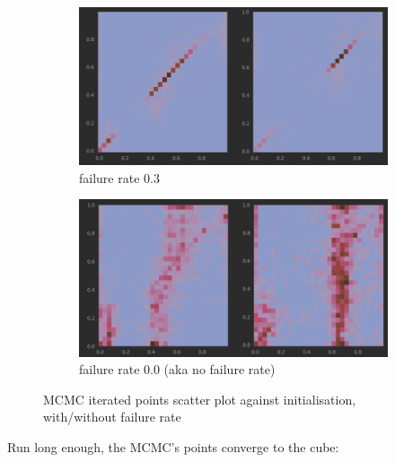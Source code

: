 \begin{figure}

  \begin{subfigure}{1.0\textwidth}
  \centering
  \includegraphics[width=\linewidth]{figures/amherst_failure_mcmc_pts.png}
  \caption{failure rate $0.3$}
\end{subfigure}

  \vspace{1em}

  \begin{subfigure}{1.0\textwidth}
  \centering
  \includegraphics[width=\linewidth]{figures/amherst_nonfailure_mcmc_pts.png}
  \caption{failure rate $0.0$ (aka no failure rate)}
\end{subfigure}

  \caption{MCMC iterated points scatter plot against initialisation, with/without failure rate}
  \label{fig:amherst_points_over_time}
\end{figure}


Run long enough, the MCMC's points converge to the cube:

